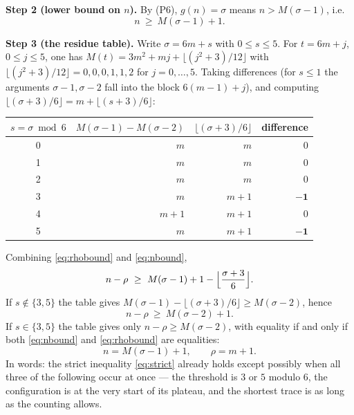 \documentclass[11pt]{article}
\theoremstyle{plain}
\theoremstyle{remark}
\begin{document}
\medskip\noindent\textbf{Step 2 (lower bound on \(n\)).}
By (P6), \(g(n)=\sigma\) means \(n>M(\sigma-1)\), i.e.
\begin{equation}\label{eq:nbound}
   n\ \ge\ M(\sigma-1)+1 .
\end{equation}

\medskip\noindent\textbf{Step 3 (the residue table).}
Write \(\sigma=6m+s\) with \(0\le s\le5\). For \(t=6m+j\), \(0\le j\le5\), one has
\(M(t)=3m^{2}+mj+\lfloor(j^{2}+3)/12\rfloor\) with
\(\lfloor(j^{2}+3)/12\rfloor=0,0,0,1,1,2\) for \(j=0,\dots,5\). Taking differences (for
\(s\le1\) the arguments \(\sigma-1,\sigma-2\) fall into the block \(6(m-1)+j\)), and
computing \(\lfloor(\sigma+3)/6\rfloor=m+\lfloor(s+3)/6\rfloor\):

\begin{center}
\begin{tabular}{crr r}
\toprule
\(s=\sigma\bmod 6\) & \(M(\sigma-1)-M(\sigma-2)\) & \(\lfloor(\sigma+3)/6\rfloor\) & difference \\
\midrule
0 & \(m\)   & \(m\)   & \(0\) \\
1 & \(m\)   & \(m\)   & \(0\) \\
2 & \(m\)   & \(m\)   & \(0\) \\
3 & \(m\)   & \(m+1\) & \(\mathbf{-1}\) \\
4 & \(m+1\) & \(m+1\) & \(0\) \\
5 & \(m\)   & \(m+1\) & \(\mathbf{-1}\) \\
\bottomrule
\end{tabular}
\end{center}

Combining \eqref{eq:rhobound} and \eqref{eq:nbound},
\[
   n-\rho\ \ge\ M(\sigma-1)+1-\Bigl\lfloor\frac{\sigma+3}{6}\Bigr\rfloor .
\]
If \(s\notin\{3,5\}\) the table gives \(M(\sigma-1)-\lfloor(\sigma+3)/6\rfloor\ge M(\sigma-2)\),
hence
\begin{equation}\label{eq:strict}
   n-\rho\ \ge\ M(\sigma-2)+1 .
\end{equation}
If \(s\in\{3,5\}\) the table gives only \(n-\rho\ge M(\sigma-2)\), with equality if and only
if both \eqref{eq:nbound} and \eqref{eq:rhobound} are equalities:
\[
   n=M(\sigma-1)+1,\qquad \rho=m+1 .
\]
In words: the strict inequality \eqref{eq:strict} already holds except possibly when all
three of the following occur at once --- the threshold is \(3\) or \(5\) modulo \(6\), the
configuration is at the very start of its plateau, and the shortest trace is as long as
the counting allows.
\end{document}
